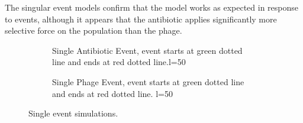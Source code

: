 The singular event models confirm that the model works as expected in response to events, although it appears that the antibiotic applies significantly more selective force on the population than the phage.
\FloatBarrier
\begin{figure}[htb!]
    \centering
    \begin{subfigure}[t]{0.45\textwidth}
        \centering
        \caption{Single Antibiotic Event, event starts at green dotted line and ends at red dotted line.l=50}
    \end{subfigure}
    \begin{subfigure}[t]{0.45\textwidth}
        \centering
        \caption{Single Phage Event, event starts at green dotted line and ends at red dotted line. l=50}
    \end{subfigure}
    \caption{Single event simulations.}
\end{figure}
